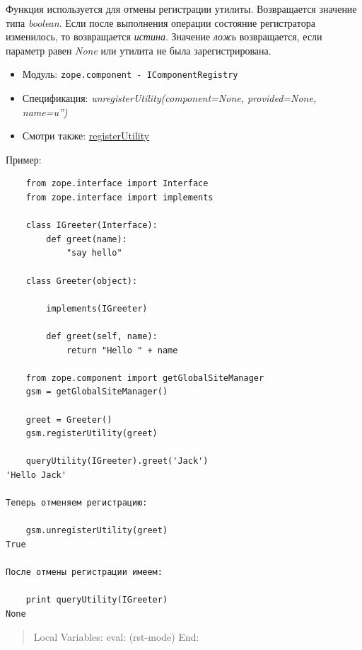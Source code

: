 \documentclass[a4paper,openany,twoside,draft]{book}
\providecommand*{\DUroletitlereference}[1]{\textsl{#1}}
\begin{document}
Функция используется для отмены регистрации утилиты.  Возвращается значение типа \DUroletitlereference{boolean}.  Если после выполнения операции состояние регистратора изменилось, то возвращается \DUroletitlereference{истина}.  Значение \DUroletitlereference{ложь} возвращается, если параметр равен \DUroletitlereference{None} или утилита не была зарегистрирована.

\begin{itemize}

\item Модуль: \texttt{zope.component - IComponentRegistry}

\item Спецификация: \DUroletitlereference{unregisterUtility(component=None, provided=None, name=u'')}

\item Смотри также: \hyperref[registerutility]{registerUtility}

\end{itemize}

Пример:

\begin{verbatim}
    from zope.interface import Interface
    from zope.interface import implements

    class IGreeter(Interface):
        def greet(name):
            "say hello"

    class Greeter(object):

        implements(IGreeter)

        def greet(self, name):
            return "Hello " + name

    from zope.component import getGlobalSiteManager
    gsm = getGlobalSiteManager()

    greet = Greeter()
    gsm.registerUtility(greet)

    queryUtility(IGreeter).greet('Jack')
'Hello Jack'

Теперь отменяем регистрацию:

    gsm.unregisterUtility(greet)
True

После отмены регистрации имеем:

    print queryUtility(IGreeter)
None
\end{verbatim}

\begin{quote}

Local Variables:
eval: (rst-mode)
End:

\end{quote}
\end{document}
